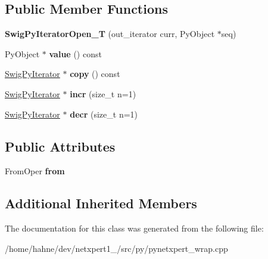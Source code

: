 \subsection*{Public Member Functions}
\begin{DoxyCompactItemize}
\item 
{\bfseries Swig\+Py\+Iterator\+Open\+\_\+T} (out\+\_\+iterator curr, Py\+Object $\ast$seq)\hypertarget{classswig_1_1SwigPyIteratorOpen__T_aad68570a11be76ad2e4c5abbdca54b1e}{}\label{classswig_1_1SwigPyIteratorOpen__T_aad68570a11be76ad2e4c5abbdca54b1e}

\item 
Py\+Object $\ast$ {\bfseries value} () const \hypertarget{classswig_1_1SwigPyIteratorOpen__T_ad640ab62c2d3f76cb418ba3b9ec7e613}{}\label{classswig_1_1SwigPyIteratorOpen__T_ad640ab62c2d3f76cb418ba3b9ec7e613}

\item 
\hyperlink{structswig_1_1SwigPyIterator}{Swig\+Py\+Iterator} $\ast$ {\bfseries copy} () const \hypertarget{classswig_1_1SwigPyIteratorOpen__T_a8a751bd7a50451246031b02e16a690f3}{}\label{classswig_1_1SwigPyIteratorOpen__T_a8a751bd7a50451246031b02e16a690f3}

\item 
\hyperlink{structswig_1_1SwigPyIterator}{Swig\+Py\+Iterator} $\ast$ {\bfseries incr} (size\+\_\+t n=1)\hypertarget{classswig_1_1SwigPyIteratorOpen__T_a6d7ddd4cc294d13214372f7619cb7ce5}{}\label{classswig_1_1SwigPyIteratorOpen__T_a6d7ddd4cc294d13214372f7619cb7ce5}

\item 
\hyperlink{structswig_1_1SwigPyIterator}{Swig\+Py\+Iterator} $\ast$ {\bfseries decr} (size\+\_\+t n=1)\hypertarget{classswig_1_1SwigPyIteratorOpen__T_a5e556e6e84a3684129c79d38c171e976}{}\label{classswig_1_1SwigPyIteratorOpen__T_a5e556e6e84a3684129c79d38c171e976}

\end{DoxyCompactItemize}
\subsection*{Public Attributes}
\begin{DoxyCompactItemize}
\item 
From\+Oper {\bfseries from}\hypertarget{classswig_1_1SwigPyIteratorOpen__T_a1fdd8b3f85a163f2c5a0aa8bf4cb996d}{}\label{classswig_1_1SwigPyIteratorOpen__T_a1fdd8b3f85a163f2c5a0aa8bf4cb996d}

\end{DoxyCompactItemize}
\subsection*{Additional Inherited Members}


The documentation for this class was generated from the following file\+:\begin{DoxyCompactItemize}
\item 
/home/hahne/dev/netxpert1\+\_/src/py/pynetxpert\+\_\+wrap.\+cpp\end{DoxyCompactItemize}
